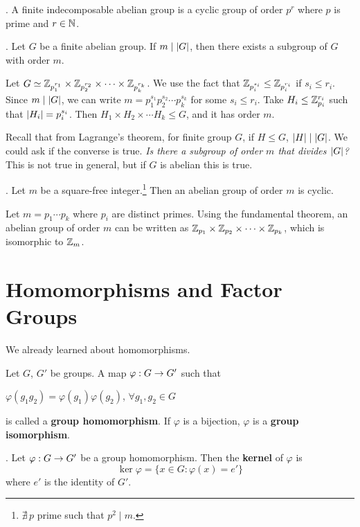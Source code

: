 \thm. A finite indecomposable abelian group is a cyclic group of order \(p^r\) where \(p\) is prime and \(r \in \mathbb{N}\).

\thm. Let \(G\) be a finite abelian group. If \(m \mid \left| G \right|\), then there exists a subgroup of \(G\) with order \(m\).

\pf Let \(G \simeq \mathbb{Z}_{p_1^{r_1}} \times \mathbb{Z}_{p_2^{r_2}} \times \cdots \times \mathbb{Z}_{p_k^{r_k}}\). We use the fact that \(\mathbb{Z}_{p_i^{s_i}} \leq \mathbb{Z}_{p_i^{r_i}}\) if \(s_i \leq r_i\). Since \(m \mid \left| G \right|\), we can write \(m = p_1^{s_1}p_2^{s_2} \cdots p_k^{s_k}\) for some \(s_i \leq r_i\). Take \(H_i \leq \mathbb{Z}_{p_i}^{r_i}\) such that \(\left| H_i \right| = p_i^{s_i}\). Then \(H_1 \times H_2 \times \cdots H_k \leq G\), and it has order \(m\).

Recall that from Lagrange's theorem, for finite group \(G\), if \(H \leq G\), \(\left| H \right| \mid \left| G \right|\). We could ask if the converse is true. \textit{Is there a subgroup of order \(m\) that divides \(\left| G \right|\)?} This is not true in general, but if \(G\) is abelian this is true.

\thm. Let \(m\) be a square-free integer.\footnote{\(\nexists\, p\) prime such that \(p^2 \mid m\).} Then an abelian group of order \(m\) is cyclic.

\pf Let \(m = p_1 \cdots p_k\) where \(p_i\) are distinct primes. Using the fundamental theorem, an abelian group of order \(m\) can be written as \(\mathbb{Z}_{p_1} \times \mathbb{Z}_{p_2} \times \cdots \times \mathbb{Z}_{p_k}\), which is isomorphic to \(\mathbb{Z}_m\).

\pagebreak

\setcounter{topic}{12}
\chapter{Homomorphisms and Factor Groups}


We already learned about homomorphisms.

\recall Let \(G\), \(G'\) be groups. A map \(\varphi: G \rightarrow G'\) such that
\begin{center}
    \(\varphi(g_1 g_2) = \varphi(g_1) \varphi(g_2)\), \quad \(\forall g_1, g_2 \in G\)
\end{center}
is called a \textbf{group homomorphism}. If \(\varphi\) is a bijection, \(\varphi\) is a \textbf{group isomorphism}.

.  Let \(\varphi: G \rightarrow G'\) be a group homomorphism. Then the \textbf{kernel} of \(\varphi\) is
\[
    \ker \varphi = \{x \in G : \varphi(x) = e'\}
\]
where \(e'\) is the identity of \(G'\).

\pagebreak
